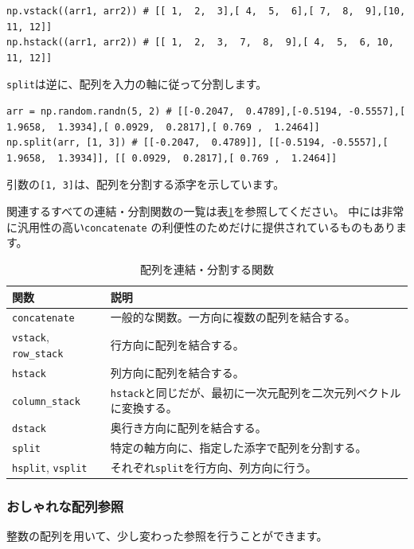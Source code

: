 \documentclass{jsarticle}
\begin{document}
            \begin{lstlisting}
np.vstack((arr1, arr2)) # [[ 1,  2,  3],[ 4,  5,  6],[ 7,  8,  9],[10, 11, 12]]
np.hstack((arr1, arr2)) # [[ 1,  2,  3,  7,  8,  9],[ 4,  5,  6, 10, 11, 12]]\end{lstlisting}

            \verb|split|は逆に、配列を入力の軸に従って分割します。

            \begin{lstlisting}
arr = np.random.randn(5, 2) # [[-0.2047,  0.4789],[-0.5194, -0.5557],[ 1.9658,  1.3934],[ 0.0929,  0.2817],[ 0.769 ,  1.2464]]
np.split(arr, [1, 3]) # [[-0.2047,  0.4789]], [[-0.5194, -0.5557],[ 1.9658,  1.3934]], [[ 0.0929,  0.2817],[ 0.769 ,  1.2464]]\end{lstlisting}

            引数の\verb|[1, 3]|は、配列を分割する添字を示しています。

            関連するすべての連結・分割関数の一覧は表\ref{tab:consp}を参照してください。
            中には非常に汎用性の高い\verb|concatenate|
            の利便性のためだけに提供されているものもあります。

            \begin{table}[h]
                \centering
                \caption{配列を連結・分割する関数}
                \label{tab:consp}
                \begin{tabular}{l|l}
                    関数 & 説明 \\ \hline
                    \verb|concatenate| & 一般的な関数。一方向に複数の配列を結合する。\\
                    \verb|vstack|, \verb|row_stack| & 行方向に配列を結合する。\\
                    \verb|hstack| & 列方向に配列を結合する。\\
                    \verb|column_stack| & \verb|hstack|と同じだが、最初に一次元配列を二次元列ベクトルに変換する。\\
                    \verb|dstack| & 奥行き方向に配列を結合する。\\
                    \verb|split| & 特定の軸方向に、指定した添字で配列を分割する。\\
                    \verb|hsplit|, \verb|vsplit| & それぞれ\verb|split|を行方向、列方向に行う。
                \end{tabular}
            \end{table}

        \subsubsection*{おしゃれな配列参照}
            整数の配列を用いて、少し変わった参照を行うことができます。
\end{document}
